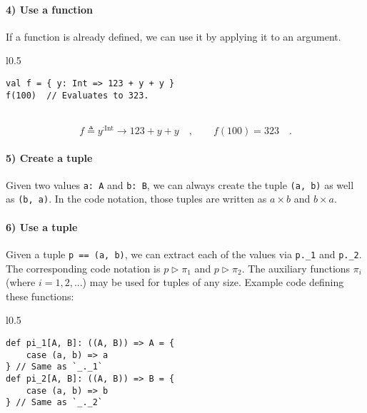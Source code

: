 \paragraph{4) Use a function}

If a function is already defined, we can use it by applying it to
an argument.

\begin{wrapfigure}{l}{0.5\columnwidth}%
\vspace{-0.65\baselineskip}
\begin{lstlisting}
val f = { y: Int => 123 + y + y }
f(100)  // Evaluates to 323.
\end{lstlisting}

\vspace{-0.25\baselineskip}
\end{wrapfigure}%

~\vspace{-0.65\baselineskip}
\[
f\triangleq y^{:\text{Int}}\rightarrow123+y+y\quad,\quad\quad f(100)=323\quad.
\]
\vspace{-0.85\baselineskip}


\paragraph{5) Create a tuple}

Given two values \lstinline!a: A! and \lstinline!b: B!, we can always
create the tuple \lstinline!(a, b)! as well as \lstinline!(b, a)!.
In the code notation, those tuples are written as $a\times b$ and
$b\times a$.

\paragraph{6) Use a tuple}

Given a tuple \lstinline!p == (a, b)!, we can extract each of the
values via \lstinline!p._1! and \lstinline!p._2!. The corresponding
code notation is $p\triangleright\pi_{1}$ and $p\triangleright\pi_{2}$.
The auxiliary functions $\pi_{i}$ (where $i=1,2,...$) may be used
for tuples of any size. Example code defining these functions:

\begin{wrapfigure}{l}{0.5\columnwidth}%
\vspace{-0.75\baselineskip}
\begin{lstlisting}
def pi_1[A, B]: ((A, B)) => A = {
    case (a, b) => a
} // Same as `_._1`
def pi_2[A, B]: ((A, B)) => B = {
    case (a, b) => b
} // Same as `_._2`
\end{lstlisting}

\vspace{-1.2\baselineskip}
\end{wrapfigure}%

